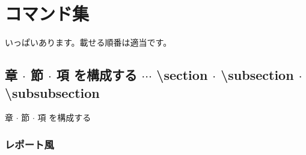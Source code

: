 \documentclass[a4j, titlepage]{jarticle}
\begin{document}
\newpage

\section{コマンド集}
いっぱいあります。載せる順番は適当です。

\subsection{章 $\cdot$ 節 $\cdot$ 項 を構成する $\cdots$ \textbackslash section $\cdot$ \textbackslash subsection $\cdot$ \textbackslash subsubsection}

章 $\cdot$ 節 $\cdot$ 項 を構成する

\subsubsection{レポート風}
\end{document}
